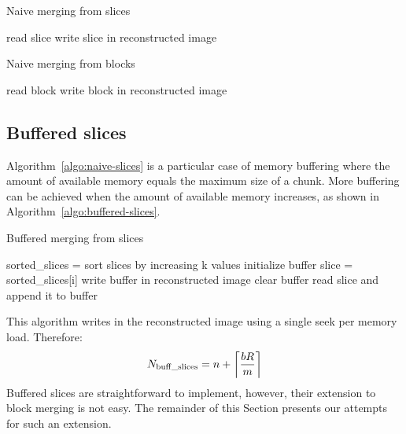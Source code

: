 \documentclass[10pt, conference, compsocconf]{IEEEtran}
\DeclarePairedDelimiter{\ceil}{\lceil}{\rceil}
\begin{document}
\begin{algorithm}
\caption{Naive merging from slices}
\label{algo:naive-slices} 
\begin{algorithmic}
    \STATE read slice
    \STATE write slice in reconstructed image
  \ENDFOR      
\end{algorithmic}
\end{algorithm}
\begin{algorithm}[h]
\caption{Naive merging from blocks}
\label{algo:naive-blocks}
\begin{algorithmic}
    \STATE read block
    \STATE write block in reconstructed image
  \ENDFOR 
\end{algorithmic}
\end{algorithm}


\subsection{Buffered slices}

Algorithm~\ref{algo:naive-slices} is a particular case of memory
buffering where the amount of available memory equals the maximum size
of a chunk. More buffering can be achieved when the amount of
available memory increases, as shown in
Algorithm~\ref{algo:buffered-slices}.
\begin{algorithm}[h]
  \caption{Buffered merging from slices}
  \label{algo:buffered-slices}
  \begin{algorithmic}[1]
    \STATE sorted\_slices = sort slices by increasing k values
    \STATE initialize buffer
      \STATE slice = sorted\_slices[i]
        \STATE write buffer in reconstructed image
        \STATE clear buffer
      \ENDIF
      \STATE read slice and append it to buffer
    \ENDFOR
  \end{algorithmic}
\end{algorithm}
This algorithm writes in the reconstructed image using a single seek
per memory load. Therefore:
\begin{equation}
N_\mathrm{buff\_slices} =  n + \ceil*{\frac{bR}{m}} \label{eq:buff-slices}
\end{equation}
Buffered slices are straightforward to implement, however, their
extension to block merging is not easy. The remainder of this Section
presents our attempts for such an extension.
\end{document}
